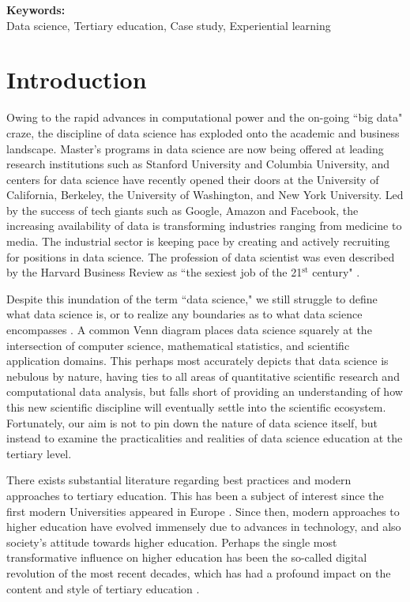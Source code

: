 \documentclass[12pt]{article}
\begin{document}
\vspace{0.4in}

\textbf{Keywords:} \\
\indent \indent Data science, Tertiary education, Case study, Experiential learning

\thispagestyle{empty}
\newpage

\section{Introduction}

Owing to the rapid advances in computational power and the on-going ``big data" craze, the discipline of data science has exploded onto the academic and business landscape. Master's programs in data science are now being offered at leading research institutions such as Stanford University and Columbia University, and centers for data science have recently opened their doors at the University of California, Berkeley, the University of Washington, and New York University. Led  by the success of tech giants such as Google, Amazon and Facebook, the increasing availability of data is transforming industries ranging from medicine to media.  The industrial sector is keeping pace by creating and actively recruiting for positions in data science.  The profession of data scientist was even described by the Harvard Business Review as ``the sexiest job of the 21$^{\text{st}}$ century" \citep{Patil2012}.

Despite this inundation of the term ``data science," we still struggle to define what data science is, or to realize any boundaries as to what data science encompasses \citep{Hayashi1998, Loukides2011, Provost2013}. A common Venn diagram places data science squarely at the intersection of computer science, mathematical statistics, and scientific application domains.  This perhaps most accurately depicts that data science is nebulous by nature, having ties to all areas of quantitative scientific research and computational data analysis, but falls short of providing an understanding of how this new scientific discipline will eventually settle into the scientific ecosystem.  Fortunately, our aim is not to pin down the nature of data science itself, but instead to examine the practicalities and realities of data science education at the tertiary level.

There exists substantial literature regarding best practices and modern approaches to tertiary education. This has been a subject of interest since the first modern Universities appeared in Europe \citep{Rudy1984, Pedersen1997}.  Since then, modern approaches to higher education have evolved immensely due to advances in technology, and also society's attitude towards higher education.  Perhaps the single most transformative influence on higher education has been the so-called digital revolution of the most recent decades, which has had a profound impact on the content and style of tertiary education \citep{Roberts1994, Ely1995, Baker1997, Wood2005, Baek2008}.
\end{document}
